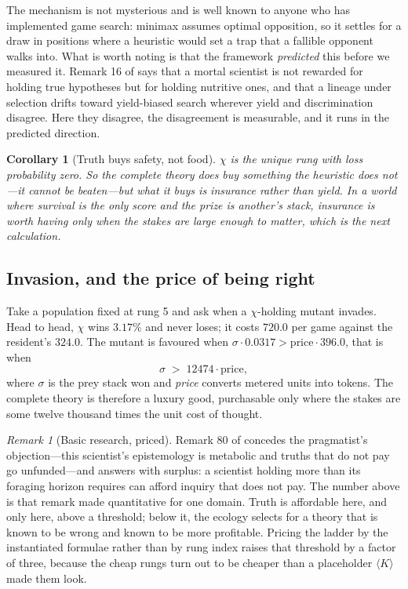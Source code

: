 \documentclass[11pt]{article}
\theoremstyle{definition}
\theoremstyle{plain}
\newtheorem{corollary}[definition]{Corollary}
\theoremstyle{remark}
\newtheorem{remark}[definition]{Remark}
\begin{document}
The mechanism is not mysterious and is well known to anyone who has implemented
game search: minimax assumes optimal opposition, so it settles for a draw in
positions where a heuristic would set a trap that a fallible opponent walks
into. What is worth noting is that the framework \emph{predicted} this before we
measured it. Remark 16 of \cite{scientist} says that a mortal scientist is not
rewarded for holding true hypotheses but for holding nutritive ones, and that a
lineage under selection drifts toward yield-biased search wherever yield and
discrimination disagree. Here they disagree, the disagreement is measurable, and
it runs in the predicted direction.

\begin{corollary}[Truth buys safety, not food]
$\chi$ is the unique rung with loss probability zero. So the complete theory
does buy something the heuristic does not---it cannot be beaten---but what it
buys is insurance rather than yield. In a world where survival is the only score
and the prize is another's stack, insurance is worth having only when the stakes
are large enough to matter, which is the next calculation.
\end{corollary}

\subsection{Invasion, and the price of being right}

Take a population fixed at rung 5 and ask when a $\chi$-holding mutant invades.
Head to head, $\chi$ wins $3.17\%$ and never loses; it costs $720.0$ per game
against the resident's $324.0$. The mutant is favoured when $\sigma \cdot
0.0317 > \text{price} \cdot 396.0$, that is when
\[
\sigma \;>\; 12474 \cdot \text{price},
\]
where $\sigma$ is the prey stack won and \emph{price} converts metered units
into tokens. The complete theory is therefore a luxury good, purchasable only
where the stakes are some twelve thousand times the unit cost of thought.

\begin{remark}[Basic research, priced]
Remark 80 of \cite{scientist} concedes the pragmatist's objection---this
scientist's epistemology is metabolic and truths that do not pay go
unfunded---and answers with surplus: a scientist holding more than its foraging
horizon requires can afford inquiry that does not pay. The number above is that
remark made quantitative for one domain. Truth is affordable here, and only
here, above a threshold; below it, the ecology selects for a theory that is
known to be wrong and known to be more profitable. Pricing the ladder by the
instantiated formulae rather than by rung index raises that threshold by a
factor of three, because the cheap rungs turn out to be cheaper than a
placeholder $\langle K\rangle$ made them look.
\end{remark}
\end{document}
